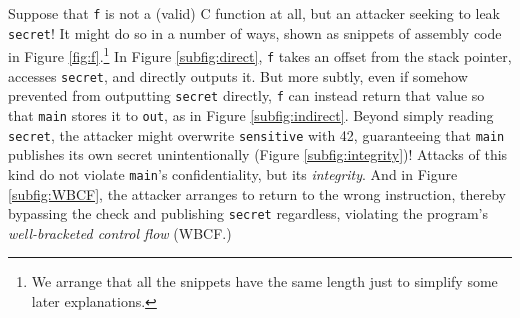 \documentclass[10pt,conference]{ieeetran}%
\theoremstyle{definition}
\begin{document}
Suppose that {\tt f} is not a (valid) C function at all, but an attacker seeking
to leak {\tt secret}! It might do so in a number of ways, shown as snippets of
assembly code in Figure \ref{fig:f}.\footnote{We arrange that all the snippets
have the same length just to simplify some later explanations.}
%
In Figure \ref{subfig:direct}, {\tt f} takes an offset from the stack
pointer, accesses {\tt secret}, and directly outputs it. But more
subtly, even if somehow prevented from outputting {\tt secret} directly, {\tt f}
can instead return that value so that {\tt main} stores it to {\tt out},
as in Figure \ref{subfig:indirect}.
%
Beyond simply reading {\tt secret}, the attacker might overwrite {\tt sensitive}
with 42, guaranteeing that {\tt main} publishes its own secret unintentionally
(Figure \ref{subfig:integrity})!
Attacks of this kind do not violate {\tt main}'s confidentiality, but its
{\it integrity}.
And in Figure \ref{subfig:WBCF}, the attacker arranges to return to the
wrong instruction, thereby bypassing the check and publishing {\tt secret} regardless,
violating the program's {\it well-bracketed control flow} (WBCF.)
\end{document}
